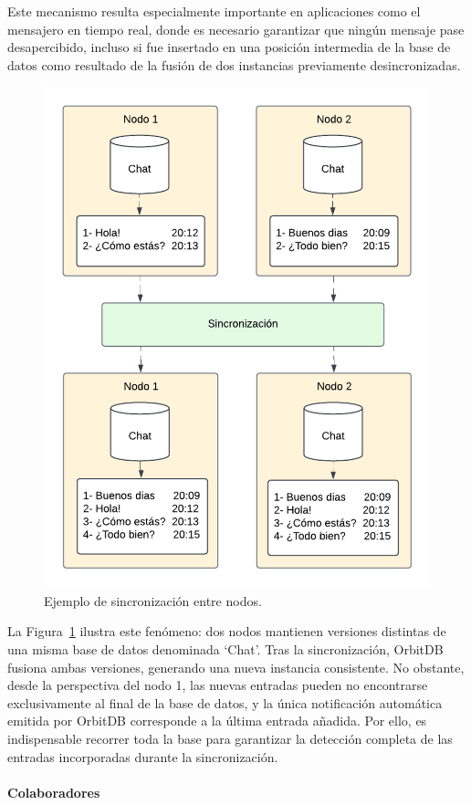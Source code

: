 Este mecanismo resulta especialmente importante en aplicaciones como el mensajero en tiempo real, donde es necesario garantizar que ningún mensaje pase desapercibido, incluso si fue insertado en una posición intermedia de la base de datos como resultado de la fusión de dos instancias previamente desincronizadas.

\begin{figure}[H]
\centering
\includegraphics[width=0.7\linewidth]{img/solucion-ipfs/ejemplo-sincronizacion.png}
\caption{Ejemplo de sincronización entre nodos.}
\label{fig:ejemplo-sincronizacion}
\end{figure}

La Figura~\ref{fig:ejemplo-sincronizacion} ilustra este fenómeno: dos nodos mantienen versiones distintas de una misma base de datos denominada ‘Chat’. Tras la sincronización, OrbitDB fusiona ambas versiones, generando una nueva instancia consistente. No obstante, desde la perspectiva del nodo 1, las nuevas entradas pueden no encontrarse exclusivamente al final de la base de datos, y la única notificación automática emitida por OrbitDB corresponde a la última entrada añadida. Por ello, es indispensable recorrer toda la base para garantizar la detección completa de las entradas incorporadas durante la sincronización.

\paragraph{Colaboradores}

